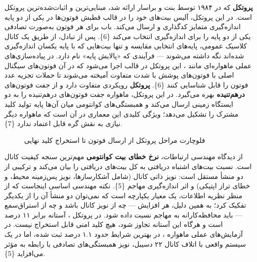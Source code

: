 \documentclass[a4paper,14pt]{extreport}
\begin{document}
\textbf{پروتکل } که در ۱۹۸۴ توسط بنت و براسار ارائه شد، مبنایی‌ترین و اثبات‌شده‌ترین پروتکل  است. در این پروتکل، آلیس بیت‌های خود را در قالب قطبش فوتون‌ها  در یکی از دو پایه اندازه‌گیری متمایز کدگذاری و ارسال می‌کند. باب برای هر فوتون به‌صورت تصادفی یکی از دو پایه را برای اندازه‌گیری انتخاب می‌کند \{6\}. پس از تبادل، از طریق یک کانال کلاسیک عمومی، پایه‌های انتخابی مقایسه و تنها بیت‌هایی که با پایه یکسان اندازه‌گیری شده‌اند نگه داشته می‌شوند --- فرآیندی که «پالایش پایه»  نام دارد. در پیاده‌سازی‌های عملی ماهواره‌ای مانند ، این پروتکل در قالب \textbf{} اجرا می‌شود که در آن فوتون‌های سیگنال اصلی با فوتون‌های پوشش با شدت متفاوت آمیخته می‌شوند تا حملات تجزیه عدد فوتون  را قابل شناسایی کنند \{6\}. \textbf{پروتکل } رویکردی متفاوت دارد و از جفت فوتون‌های \textbf{درهم‌تنیده}  بهره می‌گیرد. در این پروتکل، ماهواره جفت فوتون‌های درهم‌تنیده را به دو ایستگاه زمینی ارسال می‌کند و همبستگی‌های کوانتومی میان آن‌ها پایه تولید کلید مشترک را تشکیل می‌دهد؛ ویژگی کلیدی این معماری در آن است که ماهواره دیگر نیازی به نقش گره قابل اعتماد  ندارد \{7\}.

\begin{figure}[H]
\centering
{}
\caption{فلوچارت مراحل پروتکل  از ارسال فوتون تا استخراج کلید نهایی}
\label{fig:2-4}
\end{figure}

از دیدگاه مهندسی ارتباطات، \textbf{نرخ خطای بیت کوانتومی}  مهم‌ترین سنجه کیفیت کانال  است.  نسبت بیت‌های اشتباه دریافتی به کل بیت‌های دریافتی را بیان می‌کند و ترکیبی از دو منشأ مستقل است: نویز ذاتی کانال (شامل  آشکارسازها، نویز پس‌زمینه محیط، و خطای تراز اپتیکی) و اثر اندازه‌گیری مهاجم \{5\}. نکته مهندسی اساسی اینجاست که از منظر نظریه اطلاعات،  یک معیار یکپارچه است که نمی‌توان دو منشأ آن را از یکدیگر تفکیک کرد؛ به همین دلیل، هر افزایش  --- چه از نویز کانال باشد و چه از استراق‌سمع --- باید محافظه‌کارانه به مهاجم نسبت داده شود. در پروتکل ، آستانه  برابر ۱۱ درصد است و هرگاه این آستانه تجاوز شود، هیچ کلید امنی قابل استخراج نیست. در آزمایش‌های عملی ماهواره ،  در بهترین شرایط حدود ۱.۱ درصد ثبت شده، اما در یک سیستم واقعی با اتلاف کانال ۲۲ دسیبل، نویز همبستگی‌های تصادفی  با رابطه  به  مؤثر می‌افزاید \{5\}.
\end{document}
